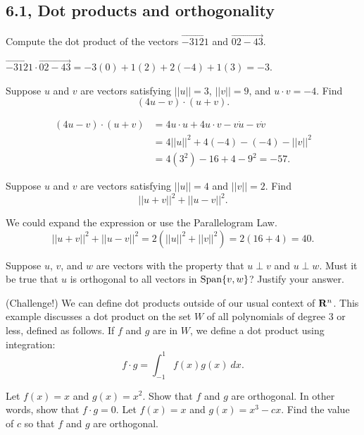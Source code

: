 

\subsection{6.1, Dot products and orthogonality}

\begin{problems}
%  
\problem Compute the dot product of the vectors $\vec{-3 1 2 1}$ and
$\vec{0 2 -4 3}$.

\begin{solution}
  $\vec{-3 1 2 1} \cdot \vec{0 2 -4 3}
  = -3(0) + 1(2) + 2(-4) + 1(3) = -3$.
\end{solution}

\problem Suppose $u$ and $v$ are vectors satisfying $||u|| = 3$,
$||v|| = 9$, and $u \cdot v = -4$.  Find
\[(4u-v) \cdot (u + v).\]

\begin{solution}
  \begin{align*}
    (4u-v) \cdot (u + v)
    & = 4 u \cdot u + 4u \cdot v - v \dot u - v \dot v \\
    & = 4 ||u||^2 + 4 (-4) - (-4) - ||v||^2 \\
    & = 4 (3^2) - 16 + 4 - 9^2
      = -57.
  \end{align*}
\end{solution}

\problem Suppose $u$ and $v$ are vectors satisfying $||u|| = 4$
and $||v|| = 2$.  Find \[||u+v||^2 + ||u-v||^2.\]

\begin{solution}
  We could expand the expression or use the Parallelogram Law.
  \[||u+v||^2 + ||u-v||^2 = 2(||u||^2 + ||v||^2)
    = 2(16 + 4) = 40.\]
\end{solution}


\problem Suppose $u$, $v$, and $w$ are vectors with the property that
$u \perp v$ and $u \perp w$.  Must it be true that $u$ is orthogonal
to all vectors in $\textup{Span}\{v, w\}$?  Justify your answer.


\problem (Challenge!) We can define dot products outside of our usual
context of ${\bf R}^n$.  This example discusses a dot product on the
set $W$ of all polynomials of degree $3$ or less, defined as follows.
If $f$ and $g$ are in $W$, we define a dot product using integration:
\[f \cdot g = \int_{-1} ^1 f(x) g(x) \ dx.\]
\begin{subproblems}
  \subproblem Let $f(x) = x$ and $g(x) = x^2$.  Show that $f$ and $g$
  are orthogonal.  In other words, show that $f \cdot g = 0$.
  \subproblem Let $f(x) = x$ and $g(x) = x^3 - cx$.  Find the value
  of $c$ so that $f$ and $g$ are orthogonal.
\end{subproblems}


\end{problems}
